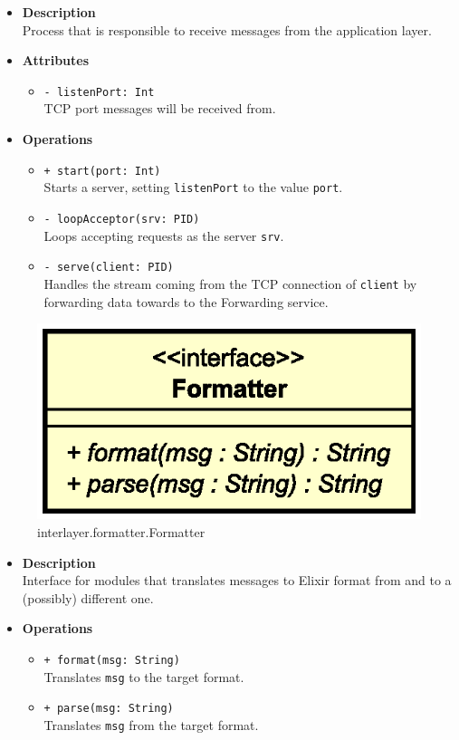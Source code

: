 \FloatBarrier
\begin{itemize}
  \item \textbf{Description} \\
    Process that is responsible to receive messages from the application layer.
  \item \textbf{Attributes}
    \begin{itemize}
      \item \texttt{- listenPort: Int} \\
    TCP port messages will be received from.
    \end{itemize}
  \item \textbf{Operations}
  \begin{itemize}
    \item \texttt{+ start(port: Int)} \\
    Starts a server, setting \texttt{listenPort} to the value \texttt{port}.
    \item \texttt{- loopAcceptor(srv: PID)} \\
    Loops accepting requests as the server \texttt{srv}.
    \item \texttt{- serve(client: PID)} \\
    Handles the stream coming from the TCP connection of \texttt{client} by
    forwarding data towards to the Forwarding service.
  \end{itemize}
\end{itemize}


\begin{figure}[H]
  \centering
  \includegraphics[width=.4\columnwidth]{images/solution/mw/int/form.eps}
  \caption{interlayer.formatter.Formatter}
  \label{fig:mw-interlayer-formatter-formatter}
\end{figure}

\FloatBarrier
\begin{itemize}
  \item \textbf{Description} \\
    Interface for modules that translates messages to Elixir format from and
    to a (possibly) different one.
  \item \textbf{Operations}
  \begin{itemize}
    \item \texttt{+ format(msg: String)} \\
    Translates \texttt{msg} to the target format.
    \item \texttt{+ parse(msg: String)} \\
    Translates \texttt{msg} from the target format.
  \end{itemize}
\end{itemize}

